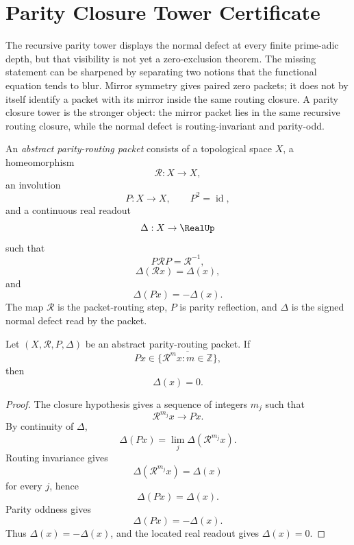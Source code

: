 \section{Parity Closure Tower Certificate}
\label{sec:unified-reality-parity-closure-tower-certificate}

The recursive parity tower displays the normal defect at every finite
prime-adic depth, but that visibility is not yet a zero-exclusion
theorem.  The missing statement can be sharpened by separating two
notions that the functional equation tends to blur.  Mirror symmetry
gives paired zero packets; it does not by itself identify a packet with
its mirror inside the same routing closure.  A parity closure tower is
the stronger object: the mirror packet lies in the same recursive
routing closure, while the normal defect is routing-invariant and
parity-odd.

\begin{definition}
\label{def:unified-reality-abstract-parity-routing-packet}
An \emph{abstract parity-routing packet} consists of a topological
space $X$, a homeomorphism
$$
\mathcal R:X\to X,
$$
an involution
$$
P:X\to X,
\qquad
P^2=\operatorname{id},
$$
and a continuous real readout
$$
\Delta:X\to\RealUp
$$
such that
$$
P\mathcal R P=\mathcal R^{-1},
$$
$$
\Delta(\mathcal R x)=\Delta(x),
$$
and
$$
\Delta(Px)=-\Delta(x).
$$
The map $\mathcal R$ is the packet-routing step, $P$ is parity
reflection, and $\Delta$ is the signed normal defect read by the packet.
\end{definition}

\begin{theorem}
\label{thm:unified-reality-parity-closure-kills-odd-defect}
Let $(X,\mathcal R,P,\Delta)$ be an abstract parity-routing packet.  If
$$
Px\in\overline{\{\mathcal R^m x:m\in\mathbb Z\}},
$$
then
$$
\Delta(x)=0.
$$
\end{theorem}

\begin{proof}
The closure hypothesis gives a sequence of integers $m_j$ such that
$$
\mathcal R^{m_j}x\to Px.
$$
By continuity of $\Delta$,
$$
\Delta(Px)=\lim_j\Delta(\mathcal R^{m_j}x).
$$
Routing invariance gives
$$
\Delta(\mathcal R^{m_j}x)=\Delta(x)
$$
for every $j$, hence
$$
\Delta(Px)=\Delta(x).
$$
Parity oddness gives
$$
\Delta(Px)=-\Delta(x).
$$
Thus $\Delta(x)=-\Delta(x)$, and the located real readout gives
$\Delta(x)=0$.
\end{proof}

